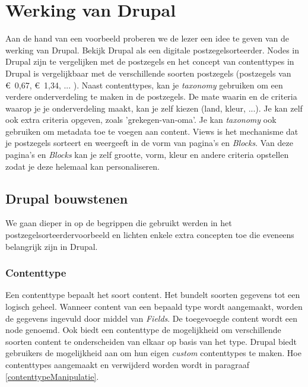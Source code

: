 \section{Werking van Drupal}

Aan de hand van een voorbeeld \cite{drupalDefGuide} proberen we de lezer een idee te geven van de werking van Drupal. Bekijk Drupal als een digitale postzegelsorteerder. Nodes in Drupal zijn te vergelijken met de postzegels en het concept van contenttypes in Drupal is vergelijkbaar met de verschillende soorten postzegels (postzegels van \euro~0,67, \euro~1,34, ... ). Naast contenttypes, kan je \textit{taxonomy} gebruiken om een verdere onderverdeling te maken in de postzegels. De mate waarin en de criteria waarop je je onderverdeling maakt, kan je zelf kiezen (land, kleur, ...). Je kan zelf ook extra criteria opgeven, zoals 'grekegen-van-oma'. Je kan \textit{taxonomy} ook gebruiken om metadata toe te voegen aan content. Views is het mechanisme dat je postzegels sorteert en weergeeft in de vorm van pagina's en \textit{Blocks}. Van deze pagina's en \textit{Blocks} kan je zelf grootte, vorm, kleur en andere criteria opstellen zodat je deze helemaal kan personaliseren. %




\subsection{Drupal bouwstenen}\label{drupalBouwstenen}
We gaan dieper in op de begrippen die gebruikt werden in het postzegelsorteerdervoorbeeld en lichten enkele extra concepten toe die eveneens belangrijk zijn in Drupal.

\subsubsection{Contenttype}
Een contenttype bepaalt het soort content. Het bundelt soorten gegevens tot een logisch geheel. Wanneer content van een bepaald type wordt aangemaakt, worden de gegevens ingevuld door middel van \textit{Fields}. De toegevoegde content wordt een node genoemd. Ook biedt een contenttype de mogelijkheid om verschillende soorten content te onderscheiden van elkaar op basis van het type.
Drupal biedt gebruikers de mogelijkheid aan om hun eigen \textit{custom} contenttypes te maken. Hoe contenttypes aangemaakt en verwijderd worden wordt in paragraaf \ref{contenttypeManipulatie}.

